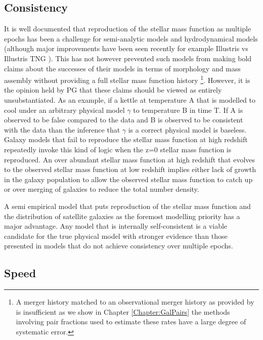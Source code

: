 \subsection{Consistency}
It is well documented that reproduction of the stellar mass function as multiple epochs has been a challenge for semi-analytic models \cite{Knebe2018CosmicModels, Asquith2018CosmicModels} and hydrodynamical models (although major improvements have been seen recently for example Illustris vs Illustris TNG \cite{Nelson2015TheRelease, Nelson2018TheRelease}). This has not however prevented such models from making bold claims about the successes of their models in terms of morphology and mass assembly without providing a full stellar mass function history \cite[e.g.][]{Somerville2008ANuclei, Hopkins2010MERGERSMATTER}\footnote{A merger history matched to an observational merger history as provided by \citet{Hopkins2010MERGERSMATTER} is insufficient as we show in Chapter \ref{Chapter:GalPairs} the methods involving pair fractions used to estimate these rates have a large degree of systematic error.}. However, it is the opinion held by PG that these claims should be viewed as entirely unsubstantiated. As an example, if a kettle at temperature A that is modelled to cool under an arbitrary physical model $\gamma$ to temperature B in time T. If A is observed to be false compared to the data and B is observed to be consistent with the data than the inference that $\gamma$ is a correct physical model is baseless. Galaxy models that fail to reproduce the stellar mass function at high redshift repeatedly invoke this kind of logic when the z=0 stellar mass function is reproduced. An over abundant stellar mass function at high redshift that evolves to the observed stellar mass function at low redshift implies either lack of growth in the galaxy population to allow the observed stellar mass function to catch up or over merging of galaxies to reduce the total number density.

A semi empirical model that puts reproduction of the stellar mass function and the distribution of satellite galaxies as the foremost modelling priority has a major advantage. Any model that is internally self-consistent is a viable candidate for the true physical model with stronger evidence than those presented in models that do not achieve consistency over multiple epochs. 

\subsection{Speed}

